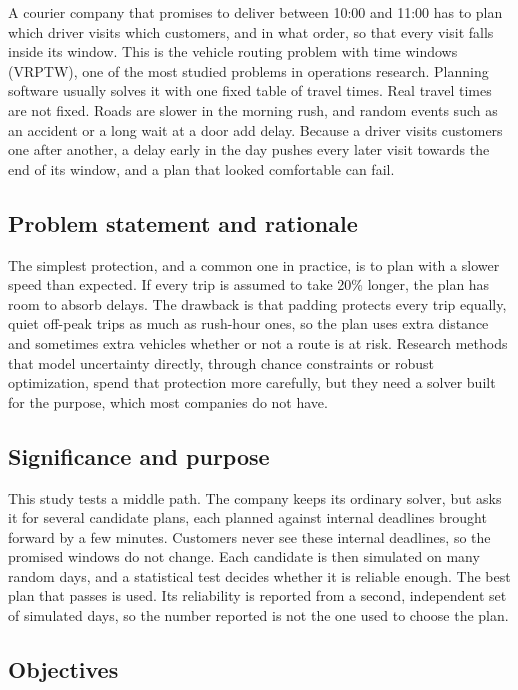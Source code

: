 \documentclass[12pt,letterpaper]{article}
\begin{document}
A courier company that promises to deliver between 10:00 and 11:00 has to plan
which driver visits which customers, and in what order, so that every visit falls
inside its window. This is the vehicle routing problem with time windows (VRPTW),
one of the most studied problems in operations research\cite{solomon1987,toth2014}.
Planning software usually solves it with one fixed table of travel times. Real
travel times are not fixed. Roads are slower in the morning rush, and random events
such as an accident or a long wait at a door add delay. Because a driver visits
customers one after another, a delay early in the day pushes every later visit
towards the end of its window, and a plan that looked comfortable can fail.

\subsection{Problem statement and rationale}

The simplest protection, and a common one in practice, is to plan with a slower
speed than expected. If every trip is assumed to take 20\% longer, the plan has room
to absorb delays. The drawback is that padding protects every trip equally, quiet
off-peak trips as much as rush-hour ones, so the plan uses extra distance and
sometimes extra vehicles whether or not a route is at risk. Research methods that
model uncertainty directly, through chance constraints or robust
optimization\cite{errico2018,agra2013,gendreau2016}, spend that protection more
carefully, but they need a solver built for the purpose, which most companies do
not have.

\subsection{Significance and purpose}

This study tests a middle path. The company keeps its ordinary solver, but asks it
for several candidate plans, each planned against internal deadlines brought
forward by a few minutes. Customers never see these internal deadlines, so the
promised windows do not change. Each candidate is then simulated on many random
days, and a statistical test decides whether it is reliable enough. The best plan
that passes is used. Its reliability is reported from a second, independent set of
simulated days, so the number reported is not the one used to choose the plan.

\subsection{Objectives}
\end{document}

